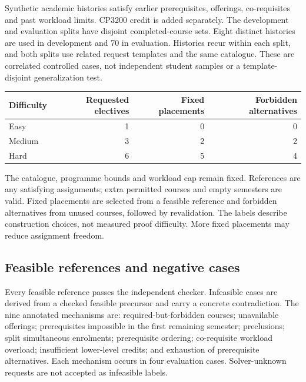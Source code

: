 \documentclass[11pt,a4paper]{article}
\begin{document}
Synthetic academic histories satisfy earlier prerequisites, offerings,
co-requisites and past workload limits. CP3200 credit is added separately.
The development and evaluation splits have disjoint completed-course sets.
Eight distinct histories are used in development and 70 in evaluation.
Histories recur within each split, and both splits use related request
templates and the same catalogue. These are correlated controlled cases,
not independent student samples or a template-disjoint generalization test.

\begin{center}
\begin{minipage}{\linewidth}
\centering
{}
\label{tab:difficulty}
\begin{tabular}{@{}lrrr@{}}
\toprule
Difficulty & Requested electives & Fixed placements & Forbidden alternatives\\
\midrule
Easy & 1 & 0 & 0\\
Medium & 3 & 2 & 2\\
Hard & 6 & 5 & 4\\
\bottomrule
\end{tabular}
\end{minipage}
\end{center}

The catalogue, programme bounds and workload cap remain fixed. References
are any satisfying assignments; extra permitted courses and empty semesters
are valid. Fixed placements are selected from a feasible reference and
forbidden alternatives from unused courses, followed by revalidation.
The labels describe construction choices, not measured proof difficulty.
More fixed placements may reduce assignment freedom.

\subsection{Feasible references and negative cases}
Every feasible reference passes the independent checker. Infeasible cases
are derived from a checked feasible precursor and carry a concrete
contradiction. The nine annotated mechanisms are: required-but-forbidden
courses; unavailable offerings; prerequisites impossible in the first
remaining semester; preclusions; split simultaneous enrolments; prerequisite
ordering; co-requisite workload overload; insufficient lower-level credits;
and exhaustion of prerequisite alternatives. Each mechanism occurs in four
evaluation cases. Solver-unknown requests are not accepted as infeasible
labels.
\end{document}
